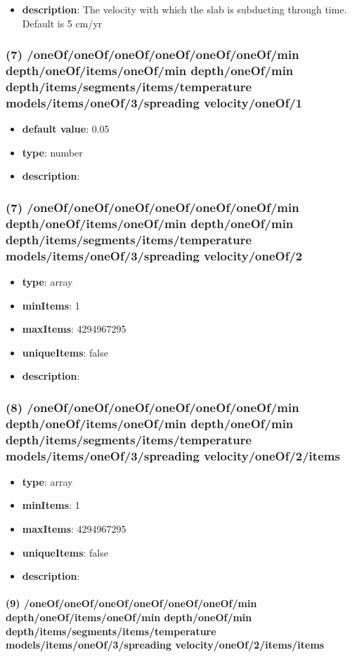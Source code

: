 \begin{itemize}[leftmargin=6em]\item {\bf description}: The velocity with which the slab is subducting through time. Default is 5 cm/yr
\end{itemize}
\subsubsection{(7) /oneOf/oneOf/oneOf/oneOf/oneOf/oneOf/min depth/oneOf/items/oneOf/min depth/oneOf/min depth/items/segments/items/temperature models/items/oneOf/3/spreading velocity/oneOf/1}
\begin{itemize}[leftmargin=7em]\item {\bf default value}: 0.05
\item {\bf type}: number
\item {\bf description}: 
\end{itemize}\subsubsection{(7) /oneOf/oneOf/oneOf/oneOf/oneOf/oneOf/min depth/oneOf/items/oneOf/min depth/oneOf/min depth/items/segments/items/temperature models/items/oneOf/3/spreading velocity/oneOf/2}
\begin{itemize}[leftmargin=7em]\item {\bf type}: array
\item {\bf minItems}: 1
\item {\bf maxItems}: 4294967295
\item {\bf uniqueItems}: false
\item {\bf description}: 
\end{itemize}\subsubsection{(8) /oneOf/oneOf/oneOf/oneOf/oneOf/oneOf/min depth/oneOf/items/oneOf/min depth/oneOf/min depth/items/segments/items/temperature models/items/oneOf/3/spreading velocity/oneOf/2/items}
\begin{itemize}[leftmargin=8em]\item {\bf type}: array
\item {\bf minItems}: 1
\item {\bf maxItems}: 4294967295
\item {\bf uniqueItems}: false
\item {\bf description}: 
\end{itemize}\paragraph{(9) /oneOf/oneOf/oneOf/oneOf/oneOf/oneOf/min depth/oneOf/items/oneOf/min depth/oneOf/min depth/items/segments/items/temperature models/items/oneOf/3/spreading velocity/oneOf/2/items/items}
